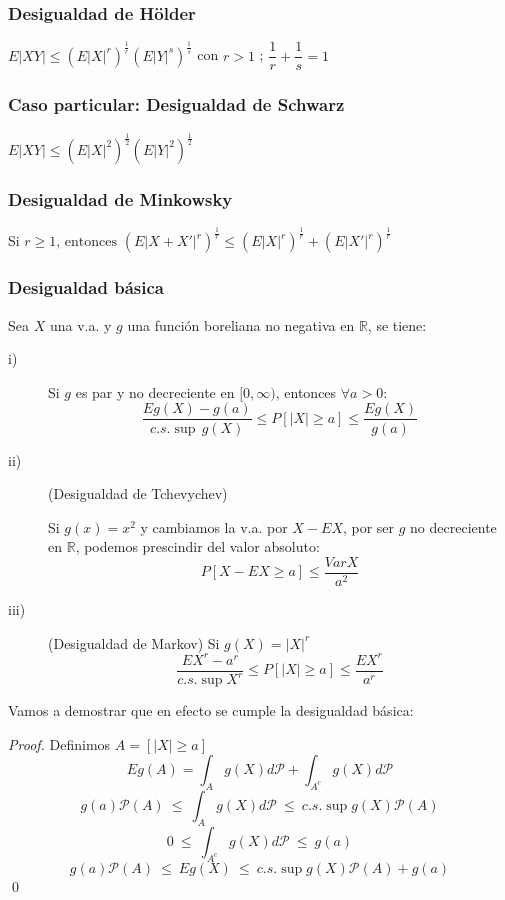 \subsubsection{Desigualdad de Hölder}
$E|XY| \leq \left(E|X|^r \right)^{\frac{1}{r}}  \left(E|Y|^s \right)^{\frac{1}{s}}$ con $r>1$ ; $ \dfrac{1}{r}+\dfrac{1}{s}=1$

\subsubsection{Caso particular: Desigualdad de Schwarz}
$E|XY|\leq \left(E|X|^2 \right)^{\frac{1}{2}} \left(E|Y|^2 \right)^{\frac{1}{2}}$

\subsubsection{Desigualdad de Minkowsky}
Si $r \geq 1 \text{, entonces } (E|X+X'|^r)^{\frac{1}{r}} \leq \left(E|X|^r \right)^{\frac{1}{r}} + \left(E|X'|^r \right)^{\frac{1}{r}}$

\subsubsection{Desigualdad básica}
Sea $X$ una v.a. y $g$ una función boreliana no negativa en $\mathbb{R}$, se tiene:

\begin{description}
\item[i)] Si $g$ es par y no decreciente en $[0,\infty)$, entonces $\forall a>0$:
$$\dfrac{Eg(X)-g(a)}{c.s. \sup\, g(X)}\leq P[|X|\geq a]\leq \dfrac{E g(X)}{g(a)}$$
\item[ii)] (Desigualdad de Tchevychev) 

Si $g(x)=x^2$ y cambiamos la v.a. por $X-EX$, por ser $g$ no decreciente en $\mathbb{R}$, podemos prescindir del valor absoluto:
$$ P[X-EX \geq a] \leq \frac{Var X}{a^2}$$
\item[iii)] (Desigualdad de Markov) Si $g(X) = |X|^r$
$$ \frac{EX^r - a^r}{c.s.\sup X^r} \leq P[|X| \geq a] \leq \frac{EX^r}{a^r} $$
\end{description}

Vamos a demostrar que en efecto se cumple la desigualdad básica:
\begin{proof}
Definimos $A = [|X| \geq a]$
$$ Eg(A) = \int_A g(X) d\mathcal{P} + \int_{A^c} g(X) d\mathcal{P} $$
$$ g(a)\mathcal{P}(A)\ \leq\ \int_A g(X)d\mathcal{P} \ \leq \ c.s.\sup g(X)\mathcal{P}(A) $$
$$ 0 \ \leq \ \int_{A^c} g(X) d\mathcal{P} \ \leq \ g(a) $$
$$ g(a)\mathcal{P}(A) \ \leq\ Eg(X) \ \leq \ c.s.\sup g(X)\mathcal{P}(A) + g(a) $$
\qed
\end{proof}


